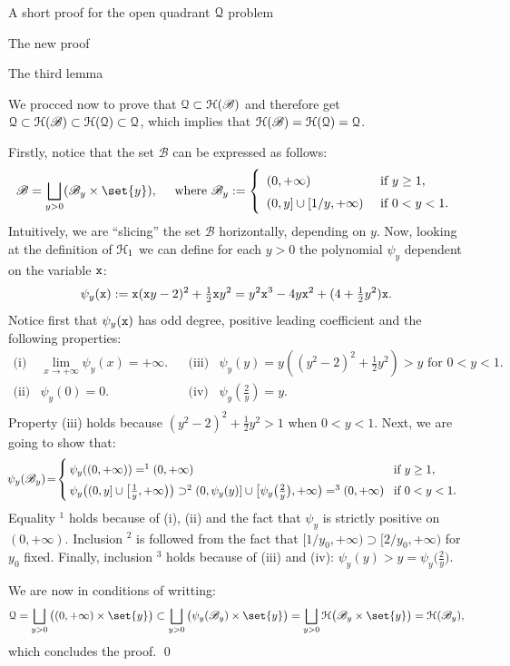 \documentclass[11pt, a4paper, english, twoside, notitlepage, openright]{report}
\begin{document}
\begin{chapter}{A short proof for the open quadrant $\mathcal{Q}$ problem}
\begin{section}{The new proof}
\begin{subsection}{The third lemma}
\begin{lemma}
\begin{Proof}
We procced now to prove that $\mathcal{Q} \subset \mathcal{H}(\mathscr{B})$ and therefore get $\mathcal{Q} \subset \mathcal{H}(\mathscr{B}) \subset \mathcal{H}(\mathcal{Q}) \subset \mathcal{Q}$, which implies that $\mathcal{H}(\mathscr{B}) = \mathcal{H}(\mathcal{Q}) = \mathcal{Q}$.

Firstly, notice that the set $\mathscr{B}$ can be expressed as follows:
$$
\mathscr{B} = \bigsqcup_{y>0}(\mathscr{B}_y \times \set{y}), \quad \text{ where } \mathscr{B}_y := 
\left\{
\begin{array}{ll}
(0, +\infty) & \text{ if } y \ge 1,\\
(0, y] \cup [1/y, +\infty) & \text { if } 0 < y < 1.
\end{array}
\right.
$$
Intuitively, we are ``slicing'' the set $\mathscr{B}$ horizontally, depending on $y$. Now, looking at the definition of $\mathcal{H}_1$ we can define for each $y > 0$ the polynomial $\psi_y$ dependent on the variable ${\tt x}$:
$$
\psi_y({\tt x}) := {\tt x}({\tt x}y - 2)^2 + \tfrac{1}{2}{\tt x}y^2 = y^2{\tt x}^3 - 4y{\tt x}^2 + (4 + \tfrac{1}{2}y^2){\tt x}.
$$
Notice first that $\psi_y({\tt x})$ has odd degree, positive leading coefficient and the following properties:
$$
\begin{array}{llcll}
\text{(i)}& \lim_{x\rightarrow+\infty}\psi_y(x) = +\infty. & &
\text{(iii)}& \psi_y(y) = y((y^2 - 2)^2 + \tfrac{1}{2}y^2) > y \text{ for } 0 < y < 1.\\
\text{(ii)}& \psi_y(0) = 0. & &
\text{(iv)}& \psi_y\left(\tfrac{2}{y}\right) = y.\\
\end{array}
$$
Property (iii) holds because $(y^2 - 2)^2 + \tfrac{1}{2}y^2 > 1$ when $0 < y < 1$. Next, we are going to show that:
$$
\! \psi_y(\mathscr{B}_y) \! = \!
\left\{ \def\arraystretch{1.5}
\begin{array}{ll} 
\! \! \psi_y((0, +\infty)) =^1 (0, +\infty) & \!\!\! \text{ if } y \ge 1,\\
\! \! \psi_y\big((0, y] \cup \big[\frac{1}{y}, +\infty\big)\big) \supset^2 (0, \psi_y(y)] \cup \big[\psi_y\big(\tfrac{2}{y}\big), +\infty\big) =^3 (0, +\infty) & \!\!\! \text{ if } 0 < y < 1.
\end{array}
\right.
$$
Equality $^1$ holds because of (i), (ii) and the fact that $\psi_y$ is strictly positive on $(0, +\infty)$. Inclusion $^2$ is followed from the fact that $[1/y_0, +\infty) \supset [2/y_0, +\infty)$ for $y_0$ fixed. Finally, inclusion $^3$ holds because of (iii) and (iv): $\psi_y(y) > y = \psi_y\big(\tfrac{2}{y}\big)$.

We are now in conditions of writting:
$$
\Qu = \bigsqcup_{y>0}\big((0, +\infty) \times \set{y}\big) \subset \bigsqcup_{y>0}\big(\psi_y(\mathscr{B}_y) \times \set{y}\big) = \bigsqcup_{y>0}\HH\big(\mathscr{B}_y \times \set{y}\big) = \HH(\mathscr{B}_y),
$$
which concludes the proof.
\qed
\end{Proof}
\end{lemma}
\end{subsection}


\end{section}
\end{chapter}
\end{document}
